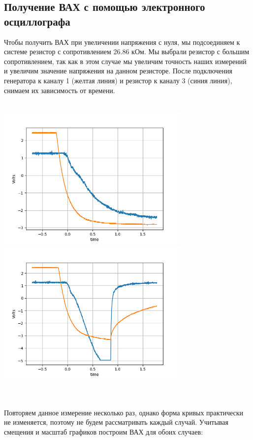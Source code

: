 \documentclass[12pt,a4paper]{article}
\begin{document}
\subsection{Получение ВАХ с помощью электронного осциллографа}
Чтобы получить ВАХ при увеличении напряжения с нуля, мы подсоединяем к системе резистор с сопротивлением 26.86 кОм. Мы выбрали резистор с большим сопротивлением, так как в этом случае мы увеличим точность наших измерений и увеличим значение напряжения на данном резисторе. После подключения генератора к каналу 1 (желтая линия) и резистор к каналу 3 (синия линия), снимаем их зависимость от времени.\\\\
\begin{flofigure}
    \centering
    \includegraphics[width=9.5cm]{Oscillograph(time).png}
    \includegraphics[width=9.5cm]{Proboi(time).png}
    \label{fig:my_label}
\end{flofigure}\\\\
Повторяем данное измерение несколько раз, однако форма кривых практически не изменяется, поэтому не будем рассматривать каждый случай. Учитывая смещения и масштаб графиков построим ВАХ для обоих случаев:\\\\
\end{document}
